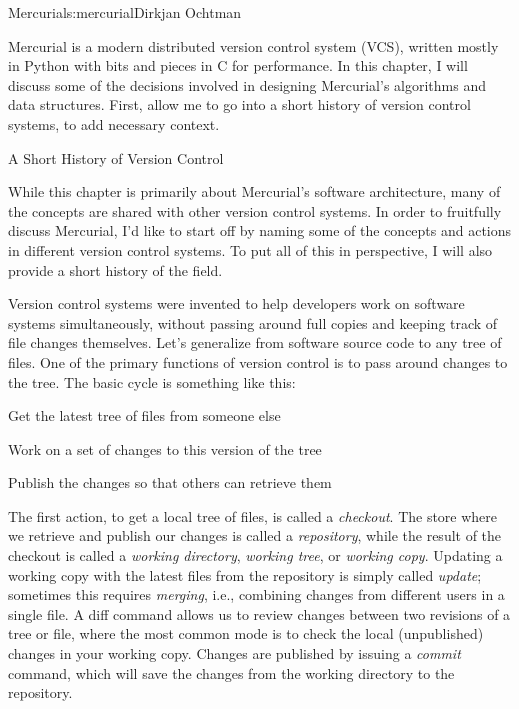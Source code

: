 \begin{aosachapter}{Mercurial}{s:mercurial}{Dirkjan Ochtman}

Mercurial is a modern distributed version control system (VCS), written
mostly in Python with bits and pieces in C for performance. In this
chapter, I will discuss some of the decisions involved in designing
Mercurial's algorithms and data structures. First, allow me to go into
a short history of version control systems, to add necessary context.

\begin{aosasect1}{ A Short History of Version Control}

While this chapter is primarily about Mercurial's software
architecture, many of the concepts are shared with other version
control systems. In order to fruitfully discuss Mercurial, I'd like to
start off by naming some of the concepts and actions in different
version control systems. To put all of this in perspective, I will
also provide a short history of the field.

Version control systems were invented to help developers work on
software systems simultaneously, without passing around full copies
and keeping track of file changes themselves. Let's generalize from
software source code to any tree of files. One of the primary
functions of version control is to pass around changes to the
tree. The basic cycle is something like this:

\begin{aosaenumerate}

  \item Get the latest tree of files from someone else

  \item Work on a set of changes to this version of the tree

  \item Publish the changes so that others can retrieve them

\end{aosaenumerate}

\noindent
The first action, to get a local tree of files, is called a
\emph{checkout}. The store where we retrieve and publish our changes
is called a \emph{repository}, while the result of the checkout is
called a \emph{working directory}, \emph{working tree}, or
\emph{working copy}. Updating a working copy with the latest files
from the repository is simply called \emph{update}; sometimes this
requires \emph{merging}, i.e., combining changes from different users
in a single file. A diff command allows us to review changes between
two revisions of a tree or file, where the most common mode is to
check the local (unpublished) changes in your working copy. Changes
are published by issuing a \emph{commit} command, which will save the
changes from the working directory to the repository.


\end{aosasect1}
\end{aosachapter}
